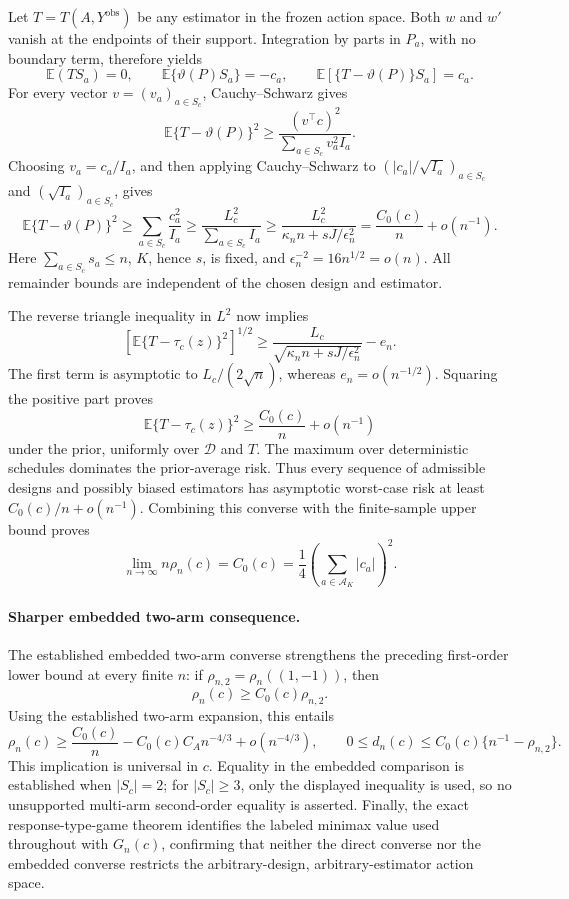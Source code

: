 Let \(T=T(A,Y^{\mathrm{obs}})\) be any estimator in the frozen action space.  Both \(w\) and \(w'\)
vanish at the endpoints of their support.  Integration by parts in \(P_a\), with no boundary term,
therefore yields
\[
 \mathbb E(TS_a)=0,
 \qquad
 \mathbb E\{\vartheta(P)S_a\}=-c_a,
 \qquad
 \mathbb E[\{T-\vartheta(P)\}S_a]=c_a.
\]
For every vector \(v=(v_a)_{a\in S_c}\), Cauchy--Schwarz gives
\[
 \mathbb E\{T-\vartheta(P)\}^2
 \geq\frac{(v^\top c)^2}{\sum_{a\in S_c}v_a^2I_a}.
\]
Choosing \(v_a=c_a/I_a\), and then applying Cauchy--Schwarz to
\((|c_a|/\sqrt{I_a})_{a\in S_c}\) and \((\sqrt{I_a})_{a\in S_c}\), gives
\[
 \mathbb E\{T-\vartheta(P)\}^2
 \geq\sum_{a\in S_c}\frac{c_a^2}{I_a}
 \geq\frac{L_c^2}{\sum_{a\in S_c}I_a}
 \geq\frac{L_c^2}{\kappa_n n+sJ/\epsilon_n^2}
 =\frac{C_0(c)}n+o(n^{-1}).
\]
Here \(\sum_{a\in S_c}s_a\leq n\), \(K\), hence \(s\), is fixed, and
\(\epsilon_n^{-2}=16n^{1/2}=o(n)\).  All remainder bounds are independent of the chosen design and
estimator.

The reverse triangle inequality in \(L^2\) now implies
\[
 \left[\mathbb E\{T-\tau_c(z)\}^2\right]^{1/2}
 \geq
 \frac{L_c}{\sqrt{\kappa_n n+sJ/\epsilon_n^2}}-e_n.
\]
The first term is asymptotic to \(L_c/(2\sqrt n)\), whereas \(e_n=o(n^{-1/2})\).  Squaring the
positive part proves
\[
 \mathbb E\{T-\tau_c(z)\}^2\geq\frac{C_0(c)}n+o(n^{-1})
\]
under the prior, uniformly over \(\mathcal D\) and \(T\).  The maximum over deterministic schedules
dominates the prior-average risk.  Thus every sequence of admissible designs and possibly biased
estimators has asymptotic worst-case risk at least \(C_0(c)/n+o(n^{-1})\).  Combining this converse
with the finite-sample upper bound proves
\[
 \lim_{n\to\infty}n\rho_n(c)=C_0(c)=\frac14
 \left(\sum_{a\in\mathcal A_K}|c_a|\right)^2.
\]

\paragraph{Sharper embedded two-arm consequence.}
The established embedded two-arm converse strengthens the preceding first-order lower bound at every
finite \(n\): if \(\rho_{n,2}=\rho_n((1,-1))\), then
\[
 \rho_n(c)\geq C_0(c)\rho_{n,2}.
\]
Using the established two-arm expansion, this entails
\[
 \rho_n(c)\geq \frac{C_0(c)}n-C_0(c)C_A n^{-4/3}+o(n^{-4/3}),
 \qquad
 0\leq d_n(c)\leq C_0(c)\{n^{-1}-\rho_{n,2}\}.
\]
This implication is universal in \(c\).  Equality in the embedded comparison is established when
\(|S_c|=2\); for \(|S_c|\geq3\), only the displayed inequality is used, so no unsupported multi-arm
second-order equality is asserted.  Finally, the exact response-type-game theorem identifies the
labeled minimax value used throughout with \(G_n(c)\), confirming that neither the direct converse nor
the embedded converse restricts the arbitrary-design, arbitrary-estimator action space.